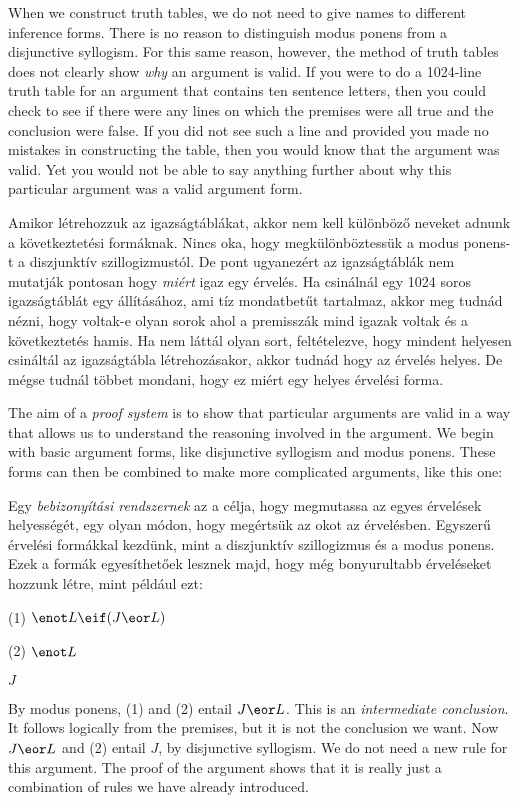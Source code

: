  When we construct truth tables, we do not need to give names to different inference forms. There is no reason to distinguish modus ponens from a disjunctive syllogism. For this same reason, however, the method of truth tables does not clearly show \emph{why} an argument is valid. If you were to do a 1024-line truth table for an argument that contains ten sentence letters, then you could check to see if there were any lines on which the premises were all true and the conclusion were false. If you did not see such a line and provided you made no mistakes in constructing the table, then you would know that the argument was valid. Yet you would not be able to say anything further about why this particular argument was a valid argument form.
 
Amikor létrehozzuk az igazságtáblákat, akkor nem kell különböző neveket adnunk a következtetési formáknak. Nincs oka, hogy megkülönböztessük a modus ponens-t a diszjunktív szillogizmustól. De pont ugyanezért az igazságtáblák nem mutatják pontosan hogy  \emph{miért} igaz egy érvelés. Ha csinálnál egy 1024 soros igazságtáblát egy állításához, ami tíz mondatbetűt tartalmaz, akkor meg tudnád nézni, hogy voltak-e olyan sorok ahol a premisszák mind igazak voltak és a következtetés hamis. Ha nem láttál olyan sort, feltételezve, hogy mindent helyesen csináltál az igazságtábla létrehozásakor, akkor tudnád hogy az érvelés helyes. De mégse tudnál többet mondani, hogy ez miért egy helyes érvelési forma. 

The aim of a \emph{proof system} is to show that particular arguments are valid in a way that allows us to understand the reasoning involved in the argument. We begin with basic argument forms, like disjunctive syllogism and modus ponens. These forms can then be combined to make more complicated arguments, like this one:

Egy \emph{bebizonyítási rendszernek} az a célja, hogy megmutassa az egyes érvelések helyességét, egy olyan módon, hogy megértsük az okot az érvelésben. Egyszerű érvelési formákkal kezdünk, mint a diszjunktív szillogizmus és a modus ponens. Ezek a formák egyesíthetőek lesznek majd, hogy még bonyurultabb érveléseket hozzunk létre, mint például ezt:



\begin{earg}
\item[(1)] $\enot L \eif (J \eor L)$
\item[(2)] $\enot L$
\item[\therefore] $J$
\end{earg}
By modus ponens, (1) and (2) entail $J \eor L$. This is an \emph{intermediate conclusion}. It follows logically from the premises, but it is not the conclusion we want. Now $J \eor L$ and (2) entail $J$, by disjunctive syllogism. We do not need a new rule for this argument. The proof of the argument shows that it is really just a combination of rules we have already introduced.

